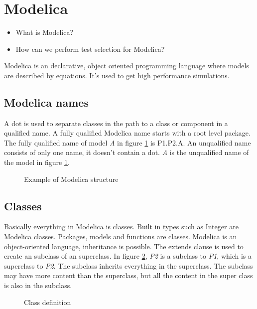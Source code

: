 \documentclass{cslthse-msc}
\begin{document}
\section{Modelica}
\begin{itemize}
	\item What is Modelica?
	\item How can we perform test selection for Modelica?
	\end{itemize}

Modelica is an declarative, object oriented programming language where models are described by equations. It's used to get high performance simulations.

\subsection{Modelica names}
A dot is used to separate classes in the path to a class or component in a qualified name. A fully qualified Modelica name starts with a root level package. The fully qualified name of model \textit{A} in figure \ref{fig:modelicaExample} is P1.P2.A. An unqualified name consists of only one name, it doesn't contain a dot. \textit{A} is the unqualified name of the model in figure \ref{fig:modelicaExample}.
\begin{figure}[!htbp]
    \centering
    \qquad
    \subfloat{\raisebox{3.2 cm}{}}
    \caption{Example of Modelica structure}
    \label{fig:modelicaExample}
\end{figure}

\subsection{Classes}
Basically everything in Modelica is classes. Built in types such as Integer are Modelica classes. Packages, models and functions are classes. Modelica is an object-oriented language, inheritance is possible. The extends clause is used to create an subclass of an superclass. In figure \ref{fig:classDefinition}, \textit{P2} is a subclass to \textit{P1}, which is a superclass to \textit{P2}. The subclass inherits everything in the superclass. The subclass may have more content than the superclass, but all the content in the super class is also in the subclass. 

\begin{figure}[H]
    \centering
    \subfloat{{}}
    \caption{Class definition}
    \label{fig:classDefinition}
\end{figure}
\end{document}
